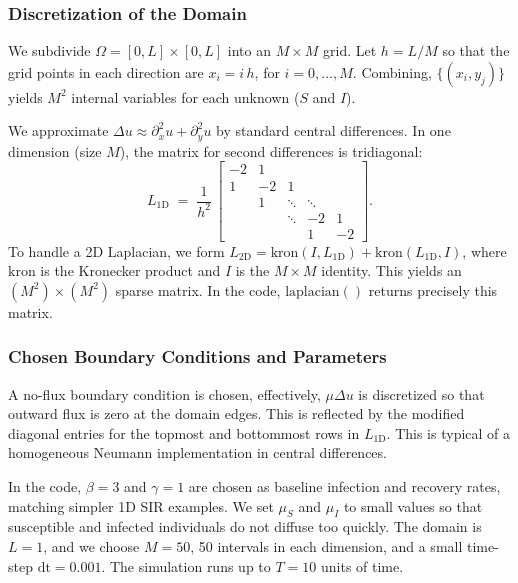 \subsubsection{Discretization of the Domain}

We subdivide \(\Omega=[0,L]\times [0,L]\) into an \(\!M\times M\) grid. Let \(h=L/M\) so that the grid points in
each direction are \(x_i = i\,h\), for \(i=0,\dots,M\). Combining,
\(\bigl\{(x_i, y_j)\bigr\}\) yields \(M^2\) internal variables for each unknown (\(S\) and \(I\)).

We approximate \(\Delta u\approx \partial_x^2u+\partial_y^2u\) by standard central differences. In one dimension 
(size \(M\)), the matrix for second differences is tridiagonal:
\[
  L_{\text{1D}} \;=\; \frac{1}{h^2}\,\begin{bmatrix}
    -2 & 1 &         &   &     \\
     1 & -2 & 1      &   &     \\
       & 1  & \ddots & \ddots &\\
       &    & \ddots & -2 & 1   \\
       &    &        & 1 & -2
  \end{bmatrix}.
\]
To handle a 2D Laplacian, we form \(L_{\text{2D}} = \text{kron}(I,L_{\text{1D}}) + \text{kron}(L_{\text{1D}},I)\), 
where \(\text{kron}\) is the Kronecker product and \(I\) is the \(M\times M\) identity. This yields an 
\((M^2)\times(M^2)\) sparse matrix. In the code, \(\mathrm{laplacian()}\) returns precisely this matrix.

\subsubsection{Chosen Boundary Conditions and Parameters}

A no-flux boundary condition is chosen, effectively, \(\mu \Delta u\) is discretized so that outward flux is zero 
at the domain edges. This is reflected by the modified diagonal entries for the topmost and bottommost rows 
in \(L_{\text{1D}}\). This is typical of a homogeneous Neumann implementation in central differences.


In the code, \(\beta=3\) and \(\gamma=1\) are chosen as baseline infection and recovery rates, matching simpler 
1D SIR examples.  We set \(\mu_S\) and \(\mu_I\) to small values so that susceptible and infected individuals do 
not diffuse too quickly.  The domain is \(L=1\), and we choose \(M=50\), 50 intervals in each dimension, and a 
small time-step \(\text{dt} = 0.001\).  The simulation runs up to \(T=10\) units of time.


